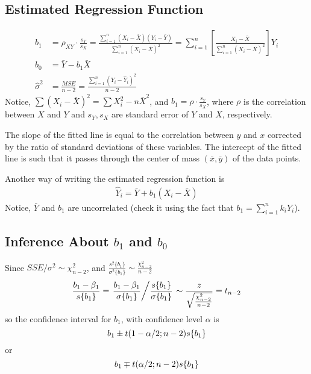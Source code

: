 \subsection{Estimated Regression Function}
\begin{align}
	b_1 & = \rho_{XY} \cdot \frac{s_Y}{s_X} = \frac{\sum_{i=1}^n (X_i-\bar X) (Y_i-\bar Y)}{\sum_{i=1}^n (X_i - \bar X)^2 } = \sum_{i=1}^n \left[\frac{X_i-\bar X}{\sum_{i=1}^n (X_i - \bar X)^2 }\right] Y_i \\
	b_0 & = \bar Y - b_1 \bar X \\
	\hat \sigma^2 & = \frac{MSE}{n-2} = \frac{\sum_{i=1}^n (Y_i - \hat Y_i)^2}{n-2}
\end{align}
Notice, $\sum(X_i-\bar X)^2 = \sum X_i^2 - n\bar X^2$, and $b_1 = \rho \cdot \frac{s_Y}{s_X}$, where $\rho$ is the correlation between $X$ and $Y$ and $s_Y, s_X$ are standard error of $Y$ and $X$, respectively.

The slope of the fitted line is equal to the correlation between $y$ and $x$ corrected by the ratio of standard deviations of these variables. The intercept of the fitted line is such that it passes through the center of mass $(\bar x, \bar y)$ of the data points.

Another way of writing the estimated regression function is
\begin{align}
	\hat Y_i = \bar Y + b_1 (X_i - \bar X)	
\end{align}
Notice, $\bar Y$ and $b_1$ are uncorrelated (check it using the fact that $b_1 = \sum_{i=1}^n k_i Y_i$).

\subsection{Inference About $b_1$ and $b_0$}
Since $SSE/\sigma^2 \sim \chi_{n-2}^2$, and $\frac{s^2\{b_1\}}{\sigma^2\{b_1\}} \sim \frac{\chi_{n-2}^2}{n-2}$
\begin{align}
	\frac{b_1-\beta_1}{s\{b_1\}} = \left. \frac{b_1-\beta_1}{\sigma\{b_1\}} \middle/ \frac{s\{b_1\}}{\sigma\{b_1\}} \right. \sim \frac{z}{\sqrt{\frac{\chi_{n-2}^2}{n-2}}} = t_{n-2}
\end{align}
so the confidence interval for $b_1$, with confidence level $\alpha$ is
\begin{equation}
	b_1 \pm t(1-\alpha/2;n-2)s\{b_1\}\\
\end{equation}
or
\begin{equation}
	b_1 \mp t(\alpha/2;n-2)s\{b_1\}\\
\end{equation}


